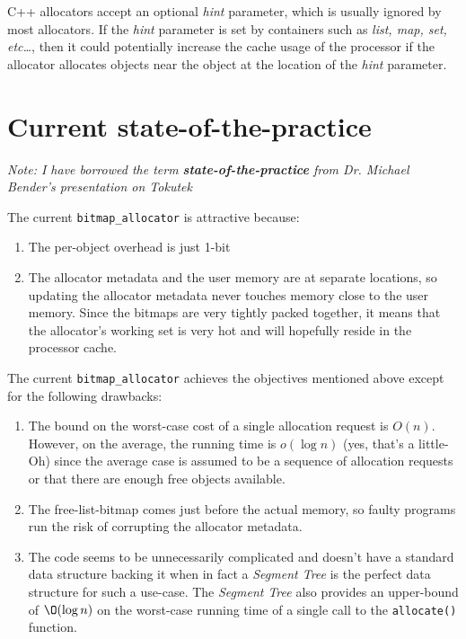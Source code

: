 \documentclass{article}
\begin{document}
C++ allocators accept an optional \textit{hint} parameter, which is
usually ignored by most allocators. If the \textit{hint} parameter is
set by containers such as \textit{list, map, set, etc\ldots{}}, then
it could potentially increase the cache usage of the processor if the
allocator allocates objects near the object at the location of the
\textit{hint} parameter.

\section{Current state-of-the-practice}

\textit{Note: I have borrowed the term \textbf{state-of-the-practice}
  from Dr. Michael Bender's presentation on Tokutek}

The current \texttt{bitmap\_allocator} is attractive because:

\begin{enumerate}

\item The per-object overhead is just 1-bit

\item The allocator metadata and the user memory are at separate
  locations, so updating the allocator metadata never touches memory
  close to the user memory. Since the bitmaps are very tightly packed
  together, it means that the allocator's working set is very hot and
  will hopefully reside in the processor cache.

\end{enumerate}

The current \texttt{bitmap\_allocator} achieves the objectives
mentioned above except for the following drawbacks:

\begin{enumerate}

\item The bound on the worst-case cost of a single allocation request
  is $O(n)$. However, on the average, the running time is $o(\log{n})$
  (yes, that's a little-Oh) since the average case is assumed to be a
  sequence of allocation requests or that there are enough free
  objects available.

\item The free-list-bitmap comes just before the actual memory, so
  faulty programs run the risk of corrupting the allocator metadata.

\item The code seems to be unnecessarily complicated and doesn't have
  a standard data structure backing it when in fact a \textit{Segment
    Tree} is the perfect data structure for such a use-case. The
  \textit{Segment Tree} also provides an upper-bound of $\O(\log{n})$
  on the worst-case running time of a single call to the
  \texttt{allocate()} function.

\end{enumerate}
\end{document}
